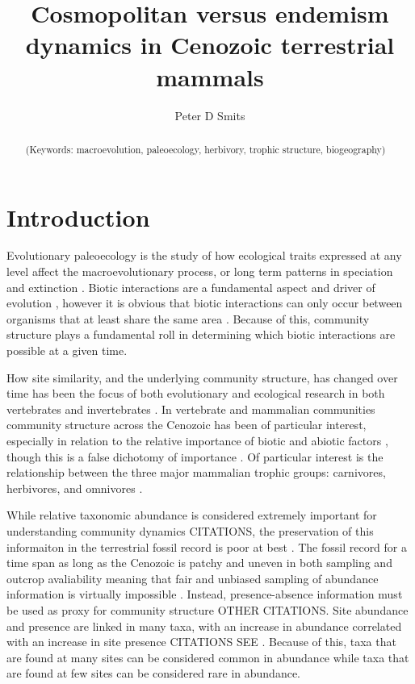 \documentclass[12pt,letterpaper]{article}
\title{Cosmopolitan versus endemism dynamics in Cenozoic terrestrial mammals}
\author[1]{Peter D Smits}
\affil[1]{Committee on Evolutionary Biology, University of Chicago}
\begin{document}
\maketitle

\linenumbers
\modulolinenumbers[2]

\begin{abstract}
  \noindent (Keywords: macroevolution, paleoecology, herbivory, trophic structure, biogeography)
\end{abstract}

\section{Introduction}
Evolutionary paleoecology is the study of how ecological traits expressed at any level affect the macroevolutionary process, or long term patterns in speciation and extinction \citep{Kitchell1985a}. 
Biotic interactions are a fundamental aspect and driver of evolution \citep{VanValen1973,Liow2011a}, however it is obvious that biotic interactions can only occur between organisms that at least share the same area \citep{Roopnarine2010,Roopnarine2006}.
Because of this, community structure plays a fundamental roll in determining which biotic interactions are possible at a given time. 

How site similarity, and the underlying community structure, has changed over time has been the focus of both evolutionary and ecological research in both vertebrates and invertebrates \citep{Jernvall2002,Jernvall2004,Raia2006,Clapham2012,Olszewski2009,Olszewski2004}. In vertebrate and mammalian communities community structure across the Cenozoic has been of particular interest, especially in relation to the relative importance of biotic and abiotic factors \citep{Jernvall2002,Jernvall2004,Alroy1996a,Alroy1998a,Badgley2013,Barnosky2003,Blois2009,Figueirido2012}, though this is a false dichotomy of importance \citep{Liow2011a}. Of particular interest is the relationship between the three major mammalian trophic groups: carnivores, herbivores, and omnivores \citep{Jernvall2004,Price2012}.

While relative taxonomic abundance is considered extremely important for understanding community dynamics CITATIONS, the preservation of this informaiton in the terrestrial fossil record is poor at best \citep{Damuth1982}. The fossil record for a time span as long as the Cenozoic is patchy and uneven in both sampling and outcrop avaliability \citep{Jernvall2004,Alroy1996a,Alroy1998a} meaning that fair and unbiased sampling of abundance information is virtually impossible \citep{Damuth1982}. Instead, presence-absence information must be used as proxy for community structure \citep{Jernvall2004}OTHER CITATIONS. Site abundance and presence are linked in many taxa, with an increase in abundance correlated with an increase in site presence CITATIONS SEE \citep{Jernvall2004}. Because of this, taxa that are found at many sites can be considered common in abundance while taxa that are found at few sites can be considered rare in abundance.
\end{document}
